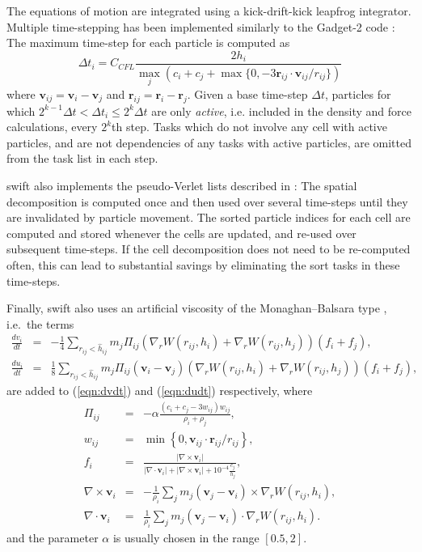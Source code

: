 \documentclass[final]{siamltex}
\newcommand{\eqn}[1]
    {(\ref{eqn:#1})}
\newcommand{\swift}
    {{\sc swift}\xspace}
\begin{document}
The equations of motion are integrated using a kick-drift-kick
leapfrog integrator.
Multiple time-stepping has been implemented similarly to
the Gadget-2 code \cite{ref:Springel2005}: The maximum time-step
for each particle is computed as
%
\begin{equation*}
    \Delta t_i = C_{CFL}\frac{2 h_i}{ \max_j\left( c_i + c_j + \max\{0,-3 \mathbf r_{ij} \cdot \mathbf v_{ij} / r_{ij} \} \right) }
\end{equation*}
%
where $\mathbf v_{ij} = \mathbf v_i - \mathbf v_j$ and
$\mathbf r_{ij} = \mathbf r_i - \mathbf r_j$.
Given a base time-step $\Delta t$, particles for which
$2^{k-1}\Delta t < \Delta t_i \leq 2^k\Delta t$ are only {\em active},
i.e. included in the density and force calculations, every $2^k$th step.
Tasks which do not involve any cell with active particles, and
are not dependencies of any tasks with active particles, are
omitted from the task list in each step.

\swift also implements the pseudo-Verlet lists described in
\cite{ref:Gonnet2013}: The spatial decomposition is computed once
and then used over several time-steps until they are invalidated
by particle movement.
The sorted particle indices for each cell are computed and stored
whenever the cells are updated, and re-used over subsequent time-steps.
If the cell decomposition does not need to be re-computed often,
this can lead to substantial savings by eliminating the sort tasks
in these time-steps.

Finally, \swift also uses an artificial viscosity of the
Monaghan--Balsara type \cite{ref:Monaghan1983,ref:Balsara1995},
i.e.~the terms
%
\begin{eqnarray*}
    \frac{dv_i}{dt} & = & -\frac{1}{4}\sum_{r_{ij} < \hat{h}_{ij}} m_j \Pi_{ij} \left({\nabla_r}W({r}_{ij},
    h_i)+{\nabla_r}W({r}_{ij}, h_j)\right) (f_i+f_j),\\
    \frac{du_i}{dt} & = & \frac{1}{8} \sum_{r_{ij} < \hat{h}_{ij}} m_j \Pi_{ij}(\mathbf{v}_i - \mathbf{v}_j)
    \left({\nabla_r}W({r}_{ij},
    h_i)+{\nabla_r}W({r}_{ij}, h_j)\right) (f_i+f_j),
\end{eqnarray*}
%
are added to \eqn{dvdt} and \eqn{dudt} respectively, where
%
\begin{eqnarray*}
    \Pi_{ij} &=& -\alpha \frac{\left(c_i + c_j - 3w_{ij}\right)w_{ij}}{\rho_i + \rho_j}, \\
    w_{ij} &=& \min\left\{0, \mathbf{v}_{ij}\cdot\mathbf{r}_{ij} / r_{ij}\right\}, \\
    f_i &=& \frac{|\nabla \times \mathbf{v}_i|}{|\nabla \cdot \mathbf{v}_i| + |\nabla \times \mathbf{v}_i| +
    10^{-4}\frac{c_j}{h_j}}, \\
    \nabla \times \mathbf{v}_i &=& -\frac{1}{\rho_i}\sum_j m_j (\mathbf{v}_j - \mathbf{v}_i)\times
    {\nabla_r}W({r}_{ij}, h_i), \\
    \nabla \cdot \mathbf{v}_i &=& \frac{1}{\rho_i}\sum_j m_j (\mathbf{v}_j - \mathbf{v}_i)\cdot {\nabla_r}W({r}_{ij},
    h_i).
\end{eqnarray*}
%
and the parameter $\alpha$ is usually chosen in the range $[0.5,2]$.
\end{document}
